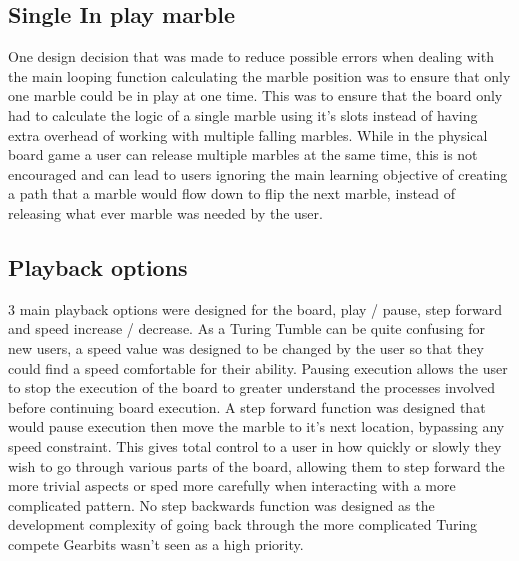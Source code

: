 \documentclass{l4proj}
\begin{document}
\subsection{Single In play marble}
One design decision that was made to reduce possible errors when dealing with the main looping function calculating the marble position was to ensure that only one marble could be in play at one time. This was to ensure that the board only had to calculate the logic of a single marble using it's slots instead of having extra overhead of working with multiple falling marbles. While in the physical board game a user can release multiple marbles at the same time, this is not encouraged and can lead to users ignoring the main learning objective of creating a path that a marble would flow down to flip the next marble, instead of releasing what ever marble was needed by the user.

\subsection{Playback options}
3 main playback options were designed for the board, play / pause, step forward and speed increase / decrease. As a Turing Tumble can be quite confusing for new users, a speed value was designed to be changed by the user so that they could find a speed comfortable for their ability. Pausing execution allows the user to stop the execution of the board to greater understand the processes involved before continuing board execution. A step forward function was designed that would pause execution then move the marble to it's next location, bypassing any speed constraint. This gives total control to a user in how quickly or slowly they wish to go through various parts of the board, allowing them to step forward the more trivial aspects or sped more carefully when interacting with a more complicated pattern. No step backwards function was designed as the development complexity of going back through the more complicated Turing compete Gearbits wasn't seen as a high priority. 
\end{document}
